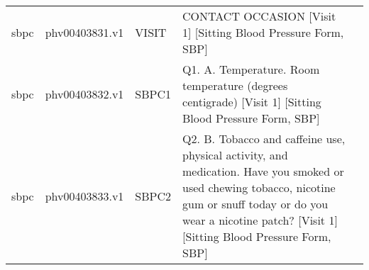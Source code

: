 \documentclass[11pt]{article}
\begin{document}
\begin{tabular}{r|llll}
	 sbpc                                                                                                                                                                                                                           & phv00403831.v1                                                                                                                                                                                                                 & VISIT                                                                                                                                                                                                                          & CONTACT OCCASION {[}Visit 1{]} {[}Sitting Blood Pressure Form, SBP{]}                                                                                                                                                         \\
	 sbpc                                                                                                                                                                                                                           & phv00403832.v1                                                                                                                                                                                                                 & SBPC1                                                                                                                                                                                                                          & Q1. A. Temperature. Room temperature (degrees centigrade) {[}Visit 1{]} {[}Sitting Blood Pressure Form, SBP{]}                                                                                                                \\
	 sbpc                                                                                                                                                                                                                           & phv00403833.v1                                                                                                                                                                                                                 & SBPC2                                                                                                                                                                                                                          & Q2. B. Tobacco and caffeine use, physical activity, and medication. Have you smoked or used chewing tobacco, nicotine gum or snuff today or do you wear a nicotine patch? {[}Visit 1{]} {[}Sitting Blood Pressure Form, SBP{]}\\
\end{tabular}
\end{document}
